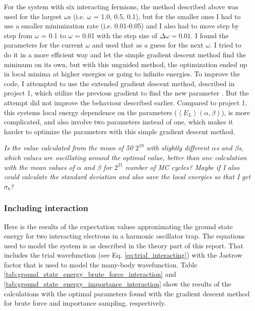 For the system with six interacting fermions, the method described above was used for the largest $\omega$s (i.e. $\omega$ = 1.0, 0.5, 0.1), but for the smaller ones I had to use a smaller minimization rate (i.e. 0.01-0.05) and I also had to move step by step from $\omega$ = 0.1 to $\omega$ = 0.01 with the step size of $\Delta \omega = 0.01$. I found the parameters for the current $\omega$ and used that as a guess for the next $\omega$. I tried to do it in a more efficient way and let the simple gradient descent method find the minimum on its own, but with this unguided method, the optimization ended up in local minima at higher energies or going to infinite energies. To improve the code, I attempted to use the extended gradient descent method, described in project 1, which utilize the previous gradient to find the new parameter  \cite{project1}. But the attempt did not improve the behaviour described earlier. Compared to project 1, this systems local energy dependence on the parameters  ($\left< E_L \right> (\alpha, \beta)$), is more complicated, and also involve two parameters instead of one, which makes it harder to optimize the parameters with this simple gradient descent method.

\textit{Is the value calculated from the mean of 50 $2^{19}$ with slightly different $\alpha$s and $\beta$s, which values are oscillating around the optimal value, better than one calculation with the mean values of $\alpha$ and $\beta$ for $2^{21}$ number of MC cycles? Maybe if I also could calculate the standard deviation and also save the local energies so that I get $\sigma_b$?}

\subsubsection{Including interaction}

Here is the results of the expectation values approximating the ground state energy for two interacting electrons in a harmonic oscillator trap. The equations used to model the system is as described in the theory part of this report. That includes the trial wavefunction (see Eq. \ref{eq:trial_interacting}) with the Jastrow factor that is used to model the many-body wavefunction. Table \ref{tab:ground_state_energy_brute_force_interaction} and \ref{tab:ground_state_energy_importance_interaction} show the results of the calculations with the optimal parameters found with the gradient descent method for brute force and importance sampling, respectively. 

